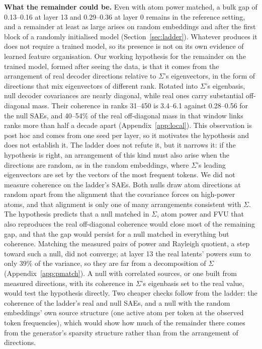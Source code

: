 \documentclass[10pt,twocolumn]{article}
\newcommand{\Sig}{\Sigma}
\begin{document}
\textbf{What the remainder could be.} Even with atom power matched, a bulk gap of 0.13--0.16 at layer 13 and 0.29--0.36 at layer 0 remains in the reference setting, and a remainder at least as large arises on random embeddings and after the first block of a randomly initialised model (Section~\ref{sec:ladder}). Whatever produces it does not require a trained model, so its presence is not on its own evidence of learned feature organisation. Our working hypothesis for the remainder on the trained model, formed after seeing the data, is that it comes from the arrangement of real decoder directions relative to $\Sig$'s eigenvectors, in the form of directions that mix eigenvectors of different rank. Rotated into $\Sig$'s eigenbasis, null decoder covariances are nearly diagonal, while real ones carry substantial off-diagonal mass. Their coherence in ranks 31--450 is 3.4--6.1 against 0.28--0.56 for the null SAEs, and 40--54\% of the real off-diagonal mass in that window links ranks more than half a decade apart (Appendix~\ref{app:local}). This observation is post hoc and comes from one seed per layer, so it motivates the hypothesis and does not establish it. The ladder does not refute it, but it narrows it: if the hypothesis is right, an arrangement of this kind must also arise when the directions are random, as in the random embeddings, where $\Sig$'s leading eigenvectors are set by the vectors of the most frequent tokens. We did not measure coherence on the ladder's SAEs. Both nulls draw atom directions at random apart from the alignment that the covariance forces on high-power atoms, and that alignment is only one of many arrangements consistent with $\Sig$. The hypothesis predicts that a null matched in $\Sig$, atom power and FVU that also reproduces the real off-diagonal coherence would close most of the remaining gap, and that the gap would persist for a null matched in everything but coherence. Matching the measured pairs of power and Rayleigh quotient, a step toward such a null, did not converge; at layer 13 the real latents' powers sum to only 39\% of the variance, so they are far from a decomposition of $\Sig$ (Appendix~\ref{app:pmatch}). A null with correlated sources, or one built from measured directions, with its coherence in $\Sig$'s eigenbasis set to the real value, would test the hypothesis directly. Two cheaper checks follow from the ladder: the coherence of the ladder's real and null SAEs, and a null with the random embeddings' own source structure (one active atom per token at the observed token frequencies), which would show how much of the remainder there comes from the generator's sparsity structure rather than from the arrangement of directions.
\end{document}
